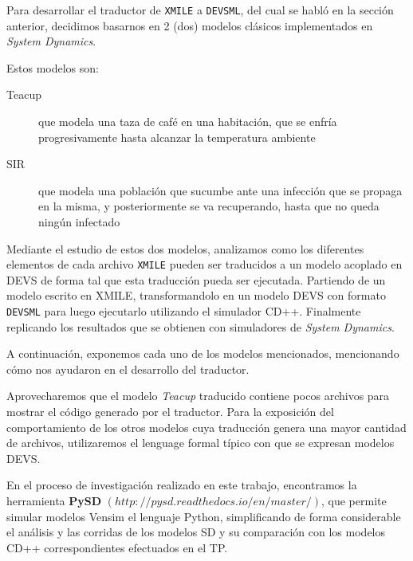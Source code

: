 Para desarrollar el traductor de \texttt{XMILE} a \texttt{DEVSML}, del cual se habló en la sección anterior, decidimos basarnos en 2 (dos) modelos clásicos implementados en \textit{System Dynamics}. 

Estos modelos son: 
\begin{description}
	\item[Teacup] que modela una taza de café en una habitación, que se enfría progresivamente hasta alcanzar la temperatura ambiente
	\item[SIR] 	que modela una población que sucumbe ante una infección que se propaga en la misma, y posteriormente se va recuperando, hasta que no queda ningún infectado
\end{description}

Mediante el estudio de estos dos modelos, analizamos como los diferentes elementos de cada archivo \texttt{XMILE} pueden ser traducidos a un modelo acoplado en DEVS  de forma tal que esta traducción pueda ser ejecutada. 
Partiendo de un modelo escrito en XMILE, transformandolo en un modelo DEVS con formato \texttt{DEVSML} para luego ejecutarlo utilizando el simulador CD++. Finalmente replicando los resultados que se obtienen con simuladores de \textit{System Dynamics}.


A continuación, exponemos cada uno de los modelos mencionados, mencionando cómo nos ayudaron en el desarrollo del traductor. 

Aprovecharemos que el modelo \textit{Teacup} traducido contiene pocos archivos para mostrar el código generado por el traductor. Para la exposición del comportamiento de los otros modelos cuya traducción genera una mayor cantidad de archivos, utilizaremos el lenguage formal típico con que se expresan modelos DEVS.

En el proceso de investigación realizado en este trabajo, encontramos la herramienta \textbf{PySD} $(http://pysd.readthedocs.io/en/master/)$, que permite simular modelos Vensim el lenguaje Python, simplificando de forma considerable el análisis y las corridas de los modelos SD y su comparación con los modelos CD++ correspondientes efectuados en el TP.
